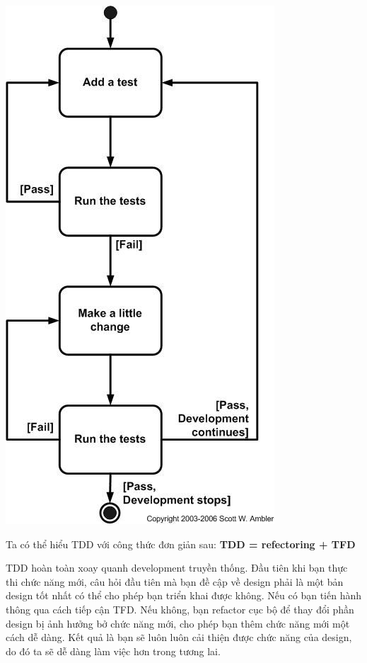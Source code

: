 \documentclass[a4paper]{article}
\begin{document}
\begin{center}
\includegraphics[scale=0.5]{hinh1.jpg}    
\end{center}
Ta có thể hiểu TDD với công thức đơn giản sau:\textbf{ TDD = refectoring + TFD}

TDD hoàn toàn xoay quanh development truyền thống. Đầu tiên khi bạn thực thi chức năng mới, câu hỏi đầu tiên mà bạn đề cập về design phải là một bản design tốt nhất có thể cho phép bạn triển khai được không. Nếu có bạn tiến hành thông qua cách tiếp cận TFD. Nếu không, bạn refactor cục bộ để thay đổi phần design bị ảnh hưởng bở chức năng mới, cho phép bạn thêm chức năng mới một cách dễ dàng. Kết quả là bạn sẽ luôn luôn cải thiện được chức năng của design, do đó ta sẽ dễ dàng làm việc hơn trong tương lai.
\end{document}
